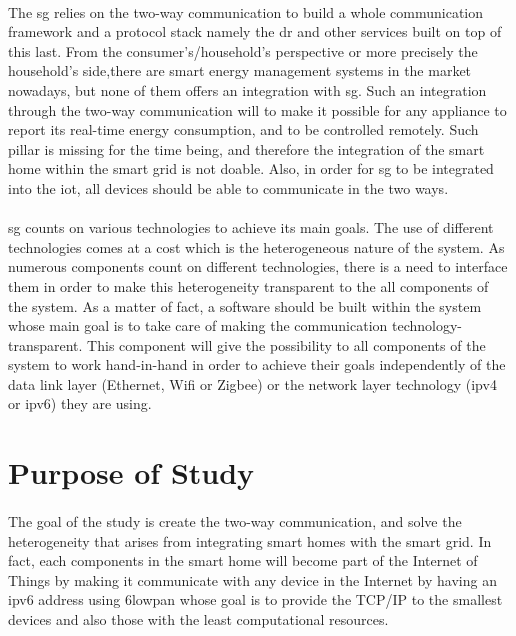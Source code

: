 \documentclass[oneside,12pt,a4paper,final]{book}
\begin{document}
\paragraph{}
The  \gls{sg} relies on the two-way communication to build a whole communication framework and a protocol stack namely the \gls{dr} and other services built on top of this last. From the consumer's/household's perspective or more precisely the household's side,there are smart energy management systems in the market nowadays, but none of them offers an integration with \gls{sg}. Such an integration through the two-way communication will to make it possible for any appliance to report its real-time energy consumption, and to be controlled remotely. Such pillar is missing for the time being, and therefore the integration of the smart home within the smart grid is not doable. Also, in order for \gls{sg} to be integrated into the \gls{iot}, all devices should be able to communicate in the two ways.
\paragraph{}
\gls{sg} counts on various technologies to achieve its main goals. The use of different technologies comes at a cost which is the heterogeneous nature of the system. As numerous components count on different technologies, there is a need to interface them in order to make this heterogeneity transparent to the all components of the system. As a matter of fact, a software should be built within the system whose main goal is to take care of making the communication technology-transparent. This component will give the possibility to all components of the system to work hand-in-hand in order to achieve their goals independently of the data link layer (Ethernet, Wifi or Zigbee) or the network layer technology (\gls{ipv4} or \gls{ipv6}) they are using.

\section{Purpose of Study}
 \paragraph{}
The goal of the study is create the two-way communication, and solve the heterogeneity that arises from integrating smart homes with the smart grid. In fact, each components in the smart home will become part of the Internet of Things by making it communicate with any device in the Internet by having an \gls{ipv6} address using \gls{6lowpan} whose goal is to provide the TCP/IP to the smallest devices and also those with the least computational resources.
\end{document}
